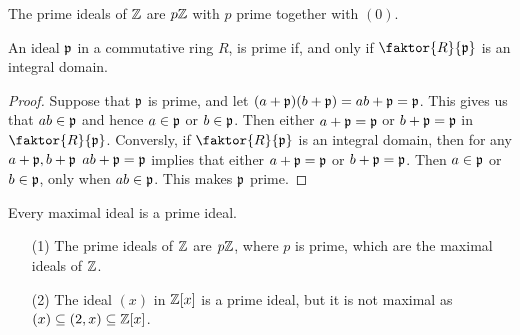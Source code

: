 \begin{example}\label{example_5.16}
  The prime ideals of $\mathbb{Z}$ are $p\mathbb{Z}$ with  $p$ prime together with $(0)$.
\end{example}

\begin{lemma}\label{lemma_5.4.5}
  An ideal $\mathfrak{p}$ in a commutative ring $R$, is prime if, and
  only if $\faktor{R}{\pf}$ is an integral domain.
\end{lemma}
\begin{proof}
  Suppose that $\mathfrak{p}$ is prime, and let  $(a+\mathfrak{p})(b+\mathfrak{p})=ab+\mathfrak{p}=\mathfrak{p}$. This gives us
  that $ab \in \mathfrak{p}$ and hence  $a \in \mathfrak{p}$ or  $b \in \mathfrak{p}$. Then either $a+\mathfrak{p}=\mathfrak{p}$
  or $b+\mathfrak{p}=\mathfrak{p}$ in $\faktor{R}{\pf}$. Conversly, if $\faktor{R}{\pf}$ is an
  integral domain, then for any $a+\mathfrak{p},b+\mathfrak{p}$  $ab+\mathfrak{p}=\mathfrak{p}$ implies that either
  $a+\mathfrak{p}=\mathfrak{p}$ or  $b+\mathfrak{p}=\mathfrak{p}$. Then $a \in \mathfrak{p}$ or  $b \in \mathfrak{p}$, only when
  $ab \in \mathfrak{p}$. This makes  $\mathfrak{p}$ prime.
\end{proof}
\begin{corollary}
  Every maximal ideal is a prime ideal.
\end{corollary}

\begin{example}\label{example_5.17}
  \begin{enumerate}
    \item[(1)] The prime ideals of $\mathbb{Z}$ are $p\mathbb{Z}$, where $p$ is prime, which
      are the maximal ideals of $\mathbb{Z}$.

    \item[(2)] The ideal $(x)$ in $\mathbb{Z}[x]$ is a prime ideal, but it is not
      maximal as $(x) \subseteq (2,x) \subseteq \mathbb{Z}[x]$.
  \end{enumerate}
\end{example}
